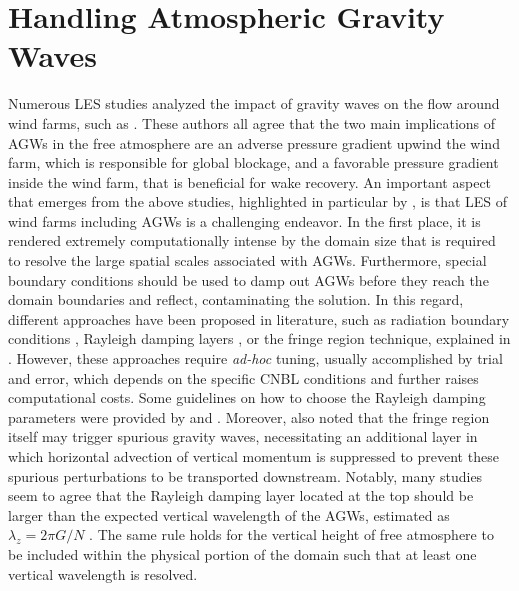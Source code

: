 \section{Handling Atmospheric Gravity Waves}
\label{sec:handlingAtmosphericGravityWaves}
Numerous LES studies analyzed the impact of gravity waves on the flow around wind farms, such as \cite{AllaertsMayers2017a,LanzilaoMeyers2022b,StipaEtAl2023b,LanzilaoMayers2023}. These authors all agree that the two main implications of AGWs in the free atmosphere are an adverse pressure gradient upwind the wind farm, which is responsible for global blockage, and a favorable pressure gradient inside the wind farm, that is beneficial for wake recovery. An important aspect that emerges from the above studies, highlighted in particular by \cite{LanzilaoMayers2023}, is that LES of wind farms including AGWs is a challenging endeavor. In the first place, it is rendered extremely computationally intense by the domain size that is required to resolve the large spatial scales associated with AGWs. Furthermore, special boundary conditions should be used to damp out AGWs before they reach the domain boundaries and reflect, contaminating the solution. In this regard, different approaches have been proposed in literature, such as radiation boundary conditions \citep{BelandWarn1975,Bennett1976}, Rayleigh damping layers \citep{KlempLilly1978}, or the fringe region technique, explained in . However, these approaches require \textit{ad-hoc} tuning, usually accomplished by trial and error, which depends on the specific CNBL conditions and further raises computational costs. Some guidelines on how to choose the Rayleigh damping parameters were provided by \cite{LanzilaoMeyers2022a} and \cite{KlempLilly1978}. Moreover, \cite{LanzilaoMeyers2022a} also noted that the fringe region itself may trigger spurious gravity waves, necessitating an additional layer in which horizontal advection of vertical momentum is suppressed to prevent these spurious perturbations to be transported downstream. Notably, many studies seem to agree that the Rayleigh damping layer located at the top should be larger than the expected vertical wavelength of the AGWs, estimated as $\lambda_z = 2\pi G/N$ \citep{KlempLilly1978,AllaertsMayers2017a,AllaertsMayers2017b,LanzilaoMeyers2022a}. The same rule holds for the vertical height of free atmosphere to be included within the physical portion of the domain such that at least one vertical wavelength is resolved. 

